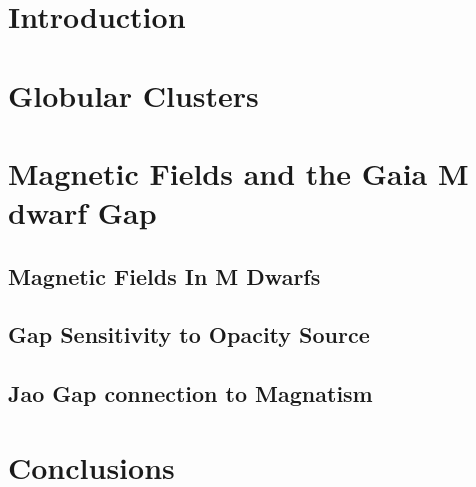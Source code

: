\documentclass{GuariniThesis}
\begin{document}
\makePrelim

\part{Introduction}


\part{Globular Clusters}


\part{Magnetic Fields and the Gaia M dwarf Gap}
\chapter{Magnetic Fields In M Dwarfs}


\chapter{Gap Sensitivity to Opacity Source}


\chapter{Jao Gap connection to Magnatism}


\part{Conclusions}



\end{document}
